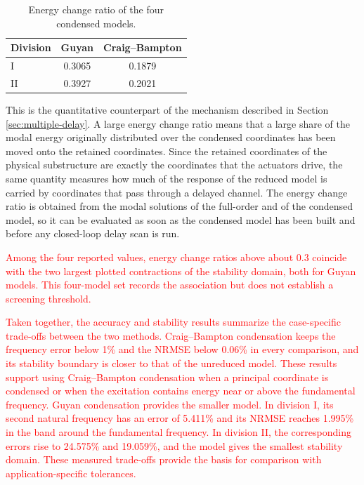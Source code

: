 \documentclass[11pt,a4paper]{article}
\numberwithin{equation}{section}
\newcommand{\rev}[1]{\textcolor{red}{#1}}
\begin{document}
\begin{table}[htbp]
	\centering
	\caption{Energy change ratio of the four condensed models.}
	\label{tab:energy}
	\begin{tabular}{lcc}
		\toprule
		Division & Guyan & Craig--Bampton\\
		\midrule
		I  & 0.3065 & 0.1879\\
		II & 0.3927 & 0.2021\\
		\bottomrule
	\end{tabular}
\end{table}

This is the quantitative counterpart of the mechanism described in Section \ref{sec:multiple-delay}. A large energy change ratio means that a large share of the modal energy originally distributed over the condensed coordinates has been moved onto the retained coordinates. Since the retained coordinates of the physical substructure are exactly the coordinates that the actuators drive, the same quantity measures how much of the response of the reduced model is carried by coordinates that pass through a delayed channel. The energy change ratio is obtained from the modal solutions of the full-order and of the condensed model, so it can be evaluated as soon as the condensed model has been built and before any closed-loop delay scan is run.

\rev{Among the four reported values, energy change ratios above about 0.3 coincide with the two largest plotted contractions of the stability domain, both for Guyan models. This four-model set records the association but does not establish a screening threshold.}

\rev{Taken together, the accuracy and stability results summarize the case-specific trade-offs between the two methods. Craig--Bampton condensation keeps the frequency error below 1\% and the NRMSE below 0.06\% in every comparison, and its stability boundary is closer to that of the unreduced model. These results support using Craig--Bampton condensation when a principal coordinate is condensed or when the excitation contains energy near or above the fundamental frequency. Guyan condensation provides the smaller model. In division I, its second natural frequency has an error of 5.411\% and its NRMSE reaches 1.995\% in the band around the fundamental frequency. In division II, the corresponding errors rise to 24.575\% and 19.059\%, and the model gives the smallest stability domain. These measured trade-offs provide the basis for comparison with application-specific tolerances.}
\end{document}
